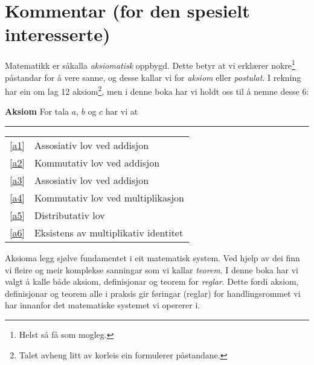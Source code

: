



	
\section*{Kommentar (for den spesielt interesserte) \label{Kommentar1}}
Matematikk er såkalla \textit{aksiomatisk} oppbygd. Dette betyr at vi erklærer nokre\footnote{Helst så få som mogleg.} påstandar for å vere sanne, og desse kallar vi for \textit{aksiom} eller \textit{postulat}. I rekning har ein om lag 12 aksiom\footnote{Talet avheng litt av korleis ein formulerer påstandane.}, men i denne boka har vi holdt oss til å nemne desse 6:
\regv 

\begin{tcolorbox}[boxrule=0.3 mm,arc=0mm,colback=blue!5] {\large \textbf{Aksiom} \vspace{5 pt}}\newline
For tala $ a $, $ b $ og $ c $ har vi at
\rule{1\linewidth}{0.75bp}
\begin{center}
	\begin{tabular}{rl}
		\eqref{a1} &Assosiativ lov ved addisjon\\
		\eqref{a2} & Kommutativ lov ved addisjon \\	
		\eqref{a3} & Assosiativ lov ved addisjon \\
		\eqref{a4} & Kommutativ lov ved multiplikasjon \\		
		\eqref{a5} & Distributativ lov\\	
		\eqref{a6} & Eksistens av multiplikativ identitet
	\end{tabular}
\end{center}
\end{tcolorbox}
\vsk
Aksioma legg sjølve fundamentet i eit matematisk system. Ved hjelp av dei finn vi fleire og meir komplekse sanningar som vi kallar \textit{teorem}. I denne boka har vi valgt å kalle både aksiom, definisjonar og teorem for \textsl{reglar}. Dette fordi aksiom, definisjonar og teorem alle i praksis gir føringar (reglar) for handlingsrommet vi har innanfor det matematiske systemet vi opererer i.\vsk
